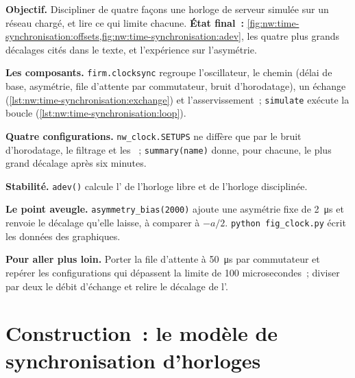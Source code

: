 \begin{tutorial}
\textbf{Objectif.} Discipliner de quatre façons une horloge de serveur simulée sur un réseau chargé, et lire ce qui limite chacune.
\textbf{État final~:} \cref{fig:nw:time-synchronisation:offsets,fig:nw:time-synchronisation:adev}, les quatre plus grands décalages cités dans le
  texte, et l'expérience sur l'asymétrie.
\begin{tutsteps}
\item \textbf{Les composants.} \texttt{firm.clocksync} regroupe l'oscillateur, le chemin (délai de base, asymétrie, file d'attente par commutateur, bruit d'horodatage),
  un échange (\cref{lst:nw:time-synchronisation:exchange}) et l'asservissement~; \texttt{simulate} exécute la boucle
  (\cref{lst:nw:time-synchronisation:loop}).
\item \textbf{Quatre configurations.} \texttt{nw\_clock.SETUPS} ne diffère que par le bruit d'horodatage, le filtrage et les ~;
  \texttt{summary(name)} donne, pour chacune, le plus grand décalage après six minutes.
\item \textbf{Stabilité.} \texttt{adev()} calcule l' de l'horloge libre et de l'horloge disciplinée.
\item \textbf{Le point aveugle.} \texttt{asymmetry\_bias(2000)} ajoute une asymétrie fixe de \qty{2}{\micro\second} et renvoie le décalage
  qu'elle laisse, à comparer à $-a/2$. \texttt{python fig\_clock.py} écrit les données des graphiques.
\end{tutsteps}
\textbf{Pour aller plus loin.} Porter la file d'attente à \qty{50}{\micro\second} par commutateur et repérer les configurations qui
  dépassent la limite de 100 microsecondes~; diviser par deux le débit d'échange et relire le décalage de l'.
\end{tutorial}

\section{Construction~: le modèle de synchronisation d'horloges}\label{bld:nw:time-synchronisation:clocksync}

